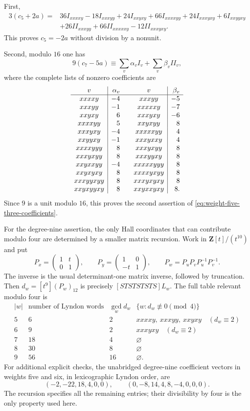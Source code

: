 First,
\begin{align*}
 3(c_5+2a)={}&36I_{xxxxy}-18I_{xxxyy}+24I_{xxyxy}
             +66I_{xxxxyy}+24I_{xxxyxy}+6I_{xxyyxy}\\
             &+26II_{xxxyy}+66II_{xxxxxy}-12II_{xxxyxy}.
\end{align*}
This proves $c_5=-2a$ without division by a nonunit.

Second, modulo $16$ one has
\begin{equation}\label{eq:weight-five-c7-certificate}
 9(c_7-5a)\equiv\sum_v\alpha_v I_v+\sum_v\beta_v II_v,
\end{equation}
where the complete lists of nonzero coefficients are
\[
\begin{array}{c|r@{\qquad}c|r}
 v&\alpha_v&v&\beta_v\\ \hline
 xxxxy&-4&xxxyy&-5\\
 xxxyy&-1&xxxxxy&-7\\
 xxyxy&6&xxxyxy&-6\\
 xxxxyy&5&xxyxyy&8\\
 xxxyxy&-4&xxxxxyy&4\\
 xxyyxy&-1&xxxyxxy&4\\
 xxxxyyy&8&xxxyxyy&8\\
 xxxyxyy&8&xxxyyxy&8\\
 xxyxxyy&-4&xxxxxyyy&8\\
 xxyxyxy&8&xxxxyxyy&8\\
 xxxyyxyy&8&xxxyxyxy&8\\
 xxyxyyxy&8&xxyxxyxy&8.
\end{array}
\]
Since $9$ is a unit modulo $16$, this proves the second assertion
of \eqref{eq:weight-five-three-coefficients}.

For the degree-nine assertion, the only Hall coordinates that
can contribute modulo four are determined by a smaller matrix
recursion.  Work in $\mathbf Z[t]/(t^{10})$ and put
\[
 P_x=\begin{pmatrix}1&t\\0&1\end{pmatrix},\qquad
 P_y=\begin{pmatrix}1&0\\-t&1\end{pmatrix},\qquad
 P_w=P_uP_vP_u^{-1}P_v^{-1}.
\]
The inverse is the usual determinant-one matrix inverse, followed
by truncation.  Then $d_w=[t^9](P_w)_{12}$ is precisely
$[STSTSTSTS]L_w$.  The full table relevant modulo four is
\[
\begin{array}{c|r|r|l}
 |w|&\text{number of Lyndon words}&\gcd_w d_w&
       \{w:d_w\not\equiv0\pmod4\}\\ \hline
 5&6&2&xxxxy,\ xxxyy,\ xxyxy\quad(d_w\equiv2)\\
 6&9&2&xxxyxy\quad(d_w\equiv2)\\
 7&18&4&\varnothing\\
 8&30&8&\varnothing\\
 9&56&16&\varnothing.
\end{array}
\]
For additional explicit checks, the unabridged degree-nine
coefficient vectors in weights five and six, in lexicographic
Lyndon order, are
\[
 (-2,-22,18,4,0,0),\qquad
 (0,-8,14,4,8,-4,0,0,0).
\]
The recursion specifies all the remaining entries; their
divisibility by four is the only property used here.

